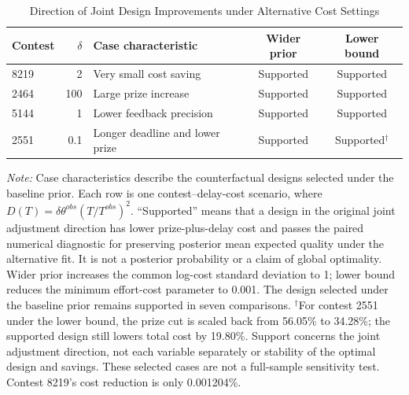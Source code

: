 \documentclass[mnsc]{informs3}
\newcommand{\figtabnotesize}{\TableSpaced\footnotesize}
\begin{document}
\begin{APPENDICES}
\begin{table}[!htbp]
\centering
\caption{Direction of Joint Design Improvements under Alternative Cost Settings}
\label{tab-cost-prior-direction}
\small
\begin{tabularx}{\textwidth}{lr>{\raggedright\arraybackslash}Xcc}
\toprule
Contest & $\delta$ & Case characteristic & Wider prior & Lower bound\\
\midrule
8219 & 2 & Very small cost saving & Supported & Supported\\
2464 & 100 & Large prize increase & Supported & Supported\\
5144 & 1 & Lower feedback precision & Supported & Supported\\
2551 & 0.1 & Longer deadline and lower prize & Supported & Supported$^{\dagger}$\\
\bottomrule
\end{tabularx}
\par\vspace{0.5ex}
\begin{minipage}{\textwidth}\figtabnotesize
\footnotesize\textit{Note:} Case characteristics describe the counterfactual designs selected under the baseline prior. {Each row is one contest--delay-cost scenario, where $D(T)=\delta\theta^{obs}(T/T^{obs})^2$. ``Supported'' means that a design in the original joint adjustment direction has lower prize-plus-delay cost and passes the paired numerical diagnostic for preserving posterior mean expected quality under the alternative fit. It is not a posterior probability or a claim of global optimality.} Wider prior increases the common log-cost standard deviation to 1; lower bound reduces the minimum effort-cost parameter to 0.001. The design selected under the baseline prior remains supported in seven comparisons. $^{\dagger}$For contest 2551 under the lower bound, the prize cut is scaled back from 56.05\% to 34.28\%; the supported design still lowers total cost by 19.80\%. Support concerns the joint adjustment direction, not each variable separately or stability of the optimal design and savings. These selected cases are not a full-sample sensitivity test. Contest 8219's cost reduction is only 0.001204\%.
\end{minipage}
\end{table}


\end{APPENDICES}
\end{document}
